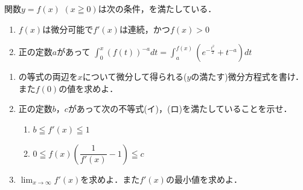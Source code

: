 \documentclass[../../main.tex]{subfiles}
\begin{document}
関数$y=f(x)$ $(x\geqq0)$は次の条件，を満たしている．
\begin{enumerate}
  \item [\ding{"AC}]$f(x)$は微分可能で$f'(x)$は連続，かつ$f(x)>0$
  \item [\ding{"AD}]正の定数$a$があって
    $\displaystyle\int_0^x{(f(t))}^{-a}dt=\int_a^{f(x)}(e^{\displaystyle-\frac{t^2}{2}}+t^{-a})dt$
\end{enumerate}
\begin{enumerate}
  \item {}の等式の両辺を$x$について微分して得られる($y$の満たす)微分方程式を書け．また$f(0)$の値を求めよ．
  \item 正の定数$b$，$c$があって次の不等式(イ)，(ロ)を満たしていることを示せ．
    \begin{enumerate}
      \item[(イ)] $b \leqq f'(x) \leqq 1$
      \item[(ロ)] $\displaystyle 0 \leqq f(x) \left( \dfrac{1}{f'(x)}-1 \right) \leqq c$
    \end{enumerate}
  \item $\displaystyle\lim_{x\to\infty}f'(x)$を求めよ．また$f'(x)$の最小値を求めよ．
\end{enumerate}
\end{document}
